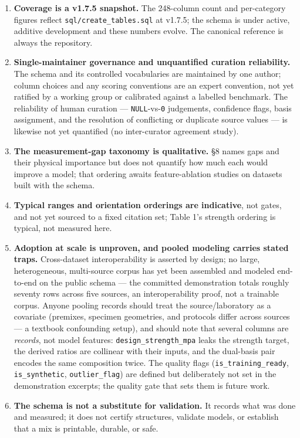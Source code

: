 \documentclass[
  11pt,
  letterpaper,
]{article}
\providecommand{\tightlist}{%
  \setlength{\itemsep}{0pt}\setlength{\parskip}{0pt}}
\begin{document}
\begin{enumerate}
\def\labelenumi{\arabic{enumi}.}
\tightlist
\item
  \textbf{Coverage is a v1.7.5 snapshot.} The 248-column count and
  per-category figures reflect \texttt{sql/create\_tables.sql} at
  v1.7.5; the schema is under active, additive development and these
  numbers evolve. The canonical reference is always the repository.
\item
  \textbf{Single-maintainer governance and unquantified curation
  reliability.} The schema and its controlled vocabularies are
  maintained by one author; column choices and any scoring conventions
  are an expert convention, not yet ratified by a working group or
  calibrated against a labelled benchmark. The reliability of human
  curation --- \texttt{NULL}-vs-\texttt{0} judgements, confidence flags,
  basis assignment, and the resolution of conflicting or duplicate
  source values --- is likewise not yet quantified (no inter-curator
  agreement study).
\item
  \textbf{The measurement-gap taxonomy is qualitative.} §8 names gaps
  and their physical importance but does not quantify how much each
  would improve a model; that ordering awaits feature-ablation studies
  on datasets built with the schema.
\item
  \textbf{Typical ranges and orientation orderings are indicative}, not
  gates, and not yet sourced to a fixed citation set; Table 1's strength
  ordering is typical, not measured here.
\item
  \textbf{Adoption at scale is unproven, and pooled modeling carries
  stated traps.} Cross-dataset interoperability is asserted by design;
  no large, heterogeneous, multi-source corpus has yet been assembled
  and modeled end-to-end on the public schema --- the committed
  demonstration totals roughly seventy rows across five sources, an
  interoperability proof, not a trainable corpus. Anyone pooling records
  should treat the source/laboratory as a covariate (premixes, specimen
  geometries, and protocols differ across sources --- a textbook
  confounding setup), and should note that several columns are
  \emph{records}, not model features: \texttt{design\_strength\_mpa}
  leaks the strength target, the derived ratios are collinear with their
  inputs, and the dual-basis pair encodes the same composition twice.
  The quality flags (\texttt{is\_training\_ready},
  \texttt{is\_synthetic}, \texttt{outlier\_flag}) are defined but
  deliberately not set in the demonstration excerpts; the quality gate
  that sets them is future work.
\item
  \textbf{The schema is not a substitute for validation.} It records
  what was done and measured; it does not certify structures, validate
  models, or establish that a mix is printable, durable, or safe.
\end{enumerate}
\end{document}
